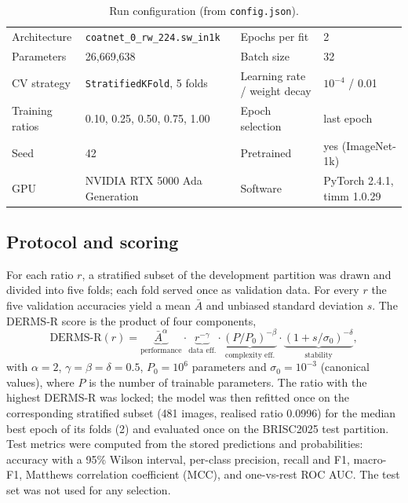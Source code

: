 \documentclass[10pt,a4paper]{article}
\begin{document}
\begin{table}[H]\centering\small
\caption{Run configuration (from \texttt{config.json}).}\label{tab:setup}
\begin{tabular}{ll@{\hspace{2.2em}}ll}
\toprule
Architecture & \texttt{coatnet\_0\_rw\_224.sw\_in1k} & Epochs per fit & 2 \\
Parameters & 26,669,638 & Batch size & 32 \\
CV strategy & \texttt{StratifiedKFold}, 5 folds & Learning rate / weight decay & $10^{-4}$ / 0.01 \\
Training ratios & 0.10, 0.25, 0.50, 0.75, 1.00 & Epoch selection & last epoch \\
Seed & 42 & Pretrained & yes (ImageNet-1k) \\
GPU & NVIDIA RTX 5000 Ada Generation & Software & PyTorch 2.4.1, timm 1.0.29 \\
\bottomrule
\end{tabular}
\end{table}

\subsection{Protocol and scoring}
For each ratio $r$, a stratified subset of the development partition was drawn and divided into five folds; each fold served once as validation data. For every $r$ the five validation accuracies yield a mean $\bar A$ and unbiased standard deviation $s$. The DERMS-R score is the product of four components,
\begin{equation}
\text{DERMS-R}(r)=\underbrace{\bar A^{\alpha}}_{\text{performance}}\cdot\underbrace{r^{-\gamma}}_{\text{data eff.}}\cdot\underbrace{(P/P_0)^{-\beta}}_{\text{complexity eff.}}\cdot\underbrace{(1+s/\sigma_0)^{-\delta}}_{\text{stability}},
\end{equation}
with $\alpha=2$, $\gamma=\beta=\delta=0.5$, $P_0=10^{6}$ parameters and $\sigma_0=10^{-3}$ (canonical values), where $P$ is the number of trainable parameters. The ratio with the highest DERMS-R was locked; the model was then refitted once on the corresponding stratified subset (481 images, realised ratio 0.0996) for the median best epoch of its folds (2) and evaluated once on the BRISC2025 test partition. Test metrics were computed from the stored predictions and probabilities: accuracy with a 95\% Wilson interval, per-class precision, recall and F1, macro-F1, Matthews correlation coefficient (MCC), and one-vs-rest ROC AUC. The test set was not used for any selection.
\end{document}
